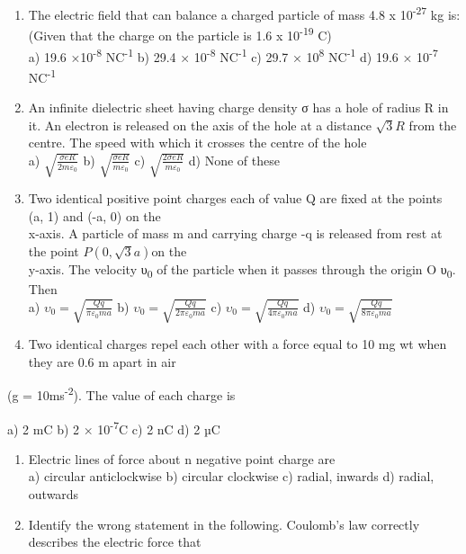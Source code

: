 \begin{enumerate}
\def\labelenumi{\arabic{enumi}.}
\setcounter{enumi}{26}
\item
  The electric field that can balance a charged particle of mass 4.8 x
  10\textsuperscript{-27} kg is: (Given that the charge on the particle
  is 1.6 x 10\textsuperscript{-19} C)\\
  a) 19.6 ×10\textsuperscript{-8} NC\textsuperscript{-1} b) 29.4 ×
  10\textsuperscript{-8} NC\textsuperscript{-1} c) 29.7 ×
  10\textsuperscript{8} NC\textsuperscript{-1} d) 19.6 ×
  10\textsuperscript{-7} NC\textsuperscript{-1}
\item
  An infinite dielectric sheet having charge density σ has a hole of
  radius R in it. An electron is released on the axis of the hole at a
  distance \(\sqrt{3}R\) from the centre. The speed with which it
  crosses the centre of the hole\\
  a) \(\sqrt{\frac{\sigma eR}{2m\varepsilon_{0}}}\) b)
  \(\sqrt{\frac{\sigma eR}{m\varepsilon_{0}}}\) c)
  \(\sqrt{\frac{2\sigma eR}{m\varepsilon_{0}}}\) d) None of these
\item
  Two identical positive point charges each of value Q are fixed at the
  points (a, 1) and (-a, 0) on the\\
  x-axis. A particle of mass m and carrying charge -q is released from
  rest at the point \(P\left( 0,\sqrt{3}a \right)\)on the\\
  y-axis. The velocity υ\textsubscript{0} of the particle when it passes
  through the origin O υ\textsubscript{0}. Then\\
  a) \(\upsilon_{0} = \sqrt{\frac{Qq}{\pi\varepsilon_{0}ma}}\) b)
  \(\upsilon_{0} = \sqrt{\frac{Qq}{2\pi\varepsilon_{0}ma}}\) c)
  \(\upsilon_{0} = \sqrt{\frac{Qq}{4\pi\varepsilon_{0}ma}}\) d)
  \(\upsilon_{0} = \sqrt{\frac{Qq}{8\pi\varepsilon_{0}ma}}\)
\item
  Two identical charges repel each other with a force equal to 10 mg wt
  when they are 0.6 m apart in air
\end{enumerate}

(g = 10ms\textsuperscript{-2}). The value of each charge is

a) 2 mC b) 2 × 10\textsuperscript{-7}C c) 2 nC d) 2 µC

\begin{enumerate}
\def\labelenumi{\arabic{enumi}.}
\setcounter{enumi}{30}
\item
  Electric lines of force about n negative point charge are\\
  a) circular anticlockwise b) circular clockwise c) radial, inwards d)
  radial, outwards
\item
  Identify the wrong statement in the following. Coulomb's law correctly
  describes the electric force that
\end{enumerate}

